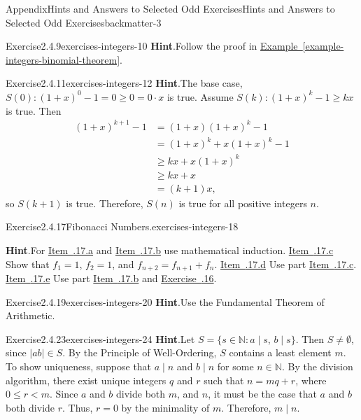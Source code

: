 \documentclass[oneside,10pt,]{book}
\newcommand{\blocktitlefont}{\relax}
\newcommand{\xreffont}{\relax}
\numberwithin{equation}{section}
\newcommand{\lt}{<}
\begin{document}
\begin{solutions-chapter}{Appendix}{Hints and Answers to Selected Odd Exercises}{}{Hints and Answers to Selected Odd Exercises}{}{}{backmatter-3}
\begin{divisionsolution}{Exercise}{2.4.9}{}{exercises-integers-10}
\noindent\textbf{\blocktitlefont Hint}.\hypertarget{exercises-integers-10-2-back}{}\quad{}Follow the proof in \hyperref[example-integers-binomial-theorem]{Example~{\xreffont\ref{example-integers-binomial-theorem}}}.%
\end{divisionsolution}%
\begin{divisionsolution}{Exercise}{2.4.11}{}{exercises-integers-12}%
\noindent\textbf{\blocktitlefont Hint}.\hypertarget{exercises-integers-12-2-back}{}\quad{}The base case, \(S(0): (1 + x)^0 - 1 = 0 \geq 0 = 0 \cdot x\) is true. Assume \(S(k): (1 + x)^k -1 \geq kx\) is true. Then%
\begin{align*}
(1 + x)^{k + 1} - 1 & = (1 + x)(1 + x)^k -1\\
& = (1 + x)^k + x(1 + x)^k - 1\\
& \geq kx + x(1 + x)^k\\
& \geq kx + x\\
& = (k + 1)x,
\end{align*}
so \(S(k + 1)\) is true. Therefore, \(S(n)\) is true for all positive integers \(n\).%
\end{divisionsolution}%
\begin{divisionsolution}{Exercise}{2.4.17}{Fibonacci Numbers.}{exercises-integers-18}%
\par\smallskip%
\noindent\textbf{\blocktitlefont Hint}.\hypertarget{exercises-integers-18-3-back}{}\quad{}For \hyperlink{fn_ineq}{Item~{\xreffont 2.4.17.a}} and \hyperlink{fn_prod}{Item~{\xreffont 2.4.17.b}} use mathematical induction. \hyperlink{fn_formula}{Item~{\xreffont 2.4.17.c}} Show that \(f_1 = 1\), \(f_2 = 1\), and \(f_{n + 2} = f_{n + 1} + f_n\). \hyperlink{fn_ratio}{Item~{\xreffont 2.4.17.d}}  Use part \hyperlink{fn_formula}{Item~{\xreffont 2.4.17.c}}. \hyperlink{fn_coprime}{Item~{\xreffont 2.4.17.e}} Use part \hyperlink{fn_prod}{Item~{\xreffont 2.4.17.b}} and \hyperlink{exercise-integers-gcd-1}{Exercise~{\xreffont 2.4.16}}.%
\end{divisionsolution}%
\begin{divisionsolution}{Exercise}{2.4.19}{}{exercises-integers-20}%
\noindent\textbf{\blocktitlefont Hint}.\hypertarget{exercises-integers-20-2-back}{}\quad{}Use the Fundamental Theorem of Arithmetic.%
\end{divisionsolution}%
\begin{divisionsolution}{Exercise}{2.4.23}{}{exercises-integers-24}%
\noindent\textbf{\blocktitlefont Hint}.\hypertarget{exercises-integers-24-2-back}{}\quad{}Let \(S = \{s \in {\mathbb N} : a \mid s\), \(b \mid s \}\). Then \(S \neq \emptyset\), since \(|ab| \in S\). By the Principle of Well-Ordering, \(S\) contains a least element \(m\). To show uniqueness, suppose that \(a \mid n\) and \(b \mid n\) for some \(n \in {\mathbb N}\). By the division algorithm, there exist unique integers \(q\) and \(r\) such that \(n = mq + r\), where \(0 \leq r \lt m\). Since \(a\) and \(b\) divide both \(m\), and \(n\), it must be the case that  \(a\) and \(b\) both divide \(r\).  Thus, \(r = 0\) by the minimality of \(m\). Therefore, \(m \mid n\).%

\end{divisionsolution}
\end{solutions-chapter}
\end{document}
